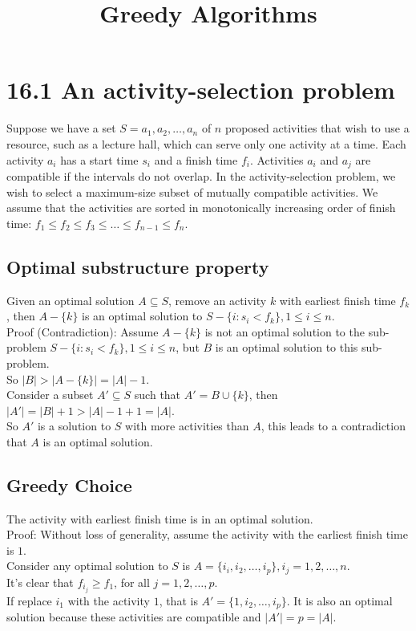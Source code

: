 \documentclass[a4paper]{article}
\title{Greedy Algorithms}
\begin{document}
\maketitle

\section*{16.1 An activity-selection problem}
Suppose we have a set $S={a_1,a_2, \dots, a_n}$ of $n$ proposed activities that wish to use a resource, such as a lecture hall, which can serve only one activity at a time. Each activity $a_i$ has a start time $s_i $ and a finish time $f_i$. Activities $a_i$ and $a_j$ are compatible if the intervals do not overlap. In the activity-selection problem, we wish to select a \color{red}maximum-size \color{black} subset of mutually compatible activities. We assume that the activities are sorted in monotonically increasing order of finish time: $f_1\leq f_2 \leq f_3 \leq \dots \leq f_{n-1} \leq f_n$.
\subsection*{Optimal substructure property}
Given an optimal solution $A\subseteq S$, remove an activity $k$ with earliest finish time $f_k$, then $A-\{k\}$ is an optimal solution to $S-\{i:s_i < f_k\}, 1\leq i\leq n$.\\
Proof (Contradiction): Assume $A-\{k\}$ is not an optimal solution to the sub-problem $S-\{i:s_i < f_k\}, 1\leq i\leq n$, but $B$ is an optimal solution to this sub-problem.\\
So $|B|>|A-\{k\}|=|A|-1$.\\
Consider a subset $A'\subseteq S$ such that $A'=B\cup \{k\}$, then $|A'|=|B|+1>|A|-1+1=|A|$.\\
So $A'$ is a solution to $S$ with more activities than $A$, this leads to a contradiction that $A$ is an optimal solution. 

\subsection*{Greedy Choice}
The activity with earliest finish time is in an optimal solution.\\
Proof: Without loss of generality, assume the activity with the earliest finish time is $1$.\\
Consider any optimal solution to $S$ is $A=\{i_i, i_2,\dots, i_p\}, i_j =1,2,\dots, n$.\\
It's clear that $f_{i_j} \geq f_1$, for all $j=1,2,\dots,p$.\\
If replace $i_1$ with the activity $1$, that is $A'= \{1, i_2, \dots, i_p\}$. It is also an optimal solution because these activities are compatible and $|A'|=p=|A|$.
\end{document}
